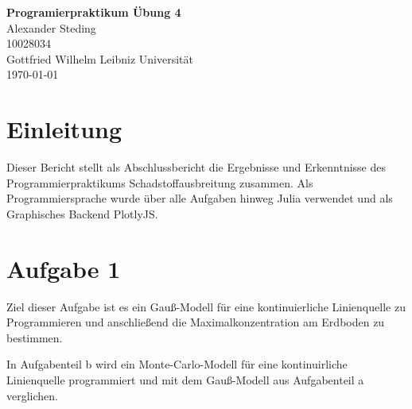 \documentclass[ngerman]{scrartcl}
\newcommand{\authA}{Alexander Steding}
\begin{document}



\begin{titlepage}
\begin{center}
\vspace{3cm}
{\fontsize{40}{49} \selectfont \textbf{Programierpraktikum Übung 4}}\\[2cm]
\Large{\authA }\\
\Large{10028034 }\\
\large{Gottfried Wilhelm Leibniz Universität\\{\today}}
\end{center}
\end{titlepage}

\newpage
\section{Einleitung }
Dieser Bericht stellt als Abschlussbericht die Ergebnisse und Erkenntnisse des Programmierpraktikums Schadstoffausbreitung zusammen. Als Programmiersprache wurde über alle Aufgaben hinweg Julia verwendet und als Graphisches Backend PlotlyJS.
\section{Aufgabe  1}
Ziel dieser Aufgabe ist es ein Gauß-Modell für eine kontinuierliche Linienquelle zu Programmieren und anschließend die Maximalkonzentration am Erdboden zu bestimmen.

In Aufgabenteil b wird ein Monte-Carlo-Modell für eine kontinuirliche Linienquelle programmiert und mit dem Gauß-Modell aus Aufgabenteil a verglichen.
\end{document}
